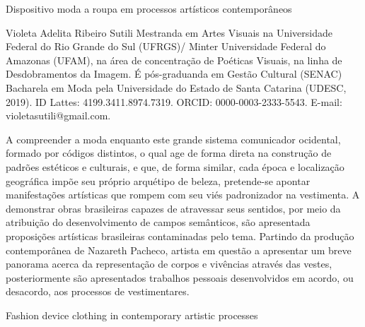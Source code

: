 \begin{refsection}
    \renewcommand{\thefigure}{\arabic{figure}}

    \chapterTwoLines
    {Dispositivo moda}
    {a roupa em processos artísticos contemporâneos}
    \label{chap:dispositivo}
    
    \articleAuthor
    {Violeta Adelita Ribeiro Sutili}
    {Mestranda em Artes Visuais na Universidade Federal do Rio Grande do Sul (UFRGS)/ Minter Universidade Federal do Amazonas (UFAM), na área de concentração de Poéticas Visuais, na linha de Desdobramentos da Imagem. É pós-graduanda em Gestão Cultural (SENAC) Bacharela em Moda pela Universidade do Estado de Santa Catarina (UDESC, 2019). ID Lattes: 4199.3411.8974.7319. ORCID: 0000-0003-2333-5543. E-mail: violetasutili@gmail.com.}

    \begin{galoResumo}
        A compreender a moda enquanto este grande sistema comunicador ocidental, formado por códigos distintos, o qual age de forma direta na construção de padrões estéticos e culturais, e que, de forma similar, cada época e localização geográfica impõe seu próprio arquétipo de beleza, pretende-se apontar manifestações artísticas que rompem com seu viés padronizador na vestimenta. A demonstrar obras brasileiras capazes de atravessar seus sentidos, por meio da atribuição do desenvolvimento de campos semânticos, são apresentada proposições artísticas brasileiras contaminadas pelo tema. Partindo da produção contemporânea de Nazareth Pacheco, artista em questão a apresentar um breve panorama acerca da representação de corpos e vivências através das vestes, posteriormente são apresentados trabalhos pessoais desenvolvidos em acordo, ou desacordo, aos processos de vestimentares.
    \end{galoResumo}
    \mednobreak
    
    \begin{otherlanguage}{english}
    
    \fakeChapterTwoLines
    {Fashion device}
    {clothing in contemporary artistic processes}


\end{otherlanguage}
\end{refsection}
